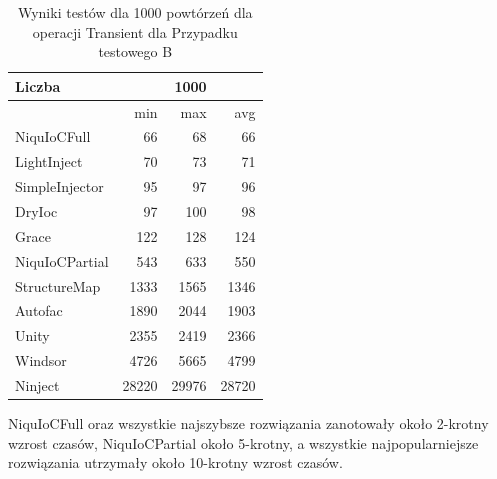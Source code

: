 \documentclass[12pt]{article}
\begin{document}
\begin{table}[H]
\captionsetup{belowskip=0pt,aboveskip=0pt}
\begin{center}
\begin{small}
	\begin{tabular}{ | l | r r r | }
    		\hline
Liczba & & 1000 & \\ \hline
 & min & max & avg \\ \hline
NiquIoCFull & 66 & 68 & 66 \\ \hline
LightInject & 70 & 73 & 71 \\ \hline
SimpleInjector & 95 & 97 & 96 \\ \hline
DryIoc & 97 & 100 & 98 \\ \hline
Grace & 122 & 128 & 124 \\ \hline
NiquIoCPartial & 543 & 633 & 550 \\ \hline
StructureMap & 1333 & 1565 & 1346 \\ \hline
Autofac & 1890 & 2044 & 1903 \\ \hline
Unity & 2355 & 2419 & 2366 \\ \hline
Windsor & 4726 & 5665 & 4799 \\ \hline
Ninject & 28220 & 29976 & 28720 \\ \hline
  	\end{tabular}
\end{small}
\end{center}
\caption{Wyniki testów dla 1000 powtórzeń dla operacji Transient dla Przypadku testowego B}
\label{TestCaseB_Transient1000}
\end{table}
NiquIoCFull oraz wszystkie najszybsze rozwiązania zanotowały około 2-krotny wzrost czasów, NiquIoCPartial około 5-krotny, a wszystkie najpopularniejsze rozwiązania utrzymały około 10-krotny wzrost czasów.
\end{document}
